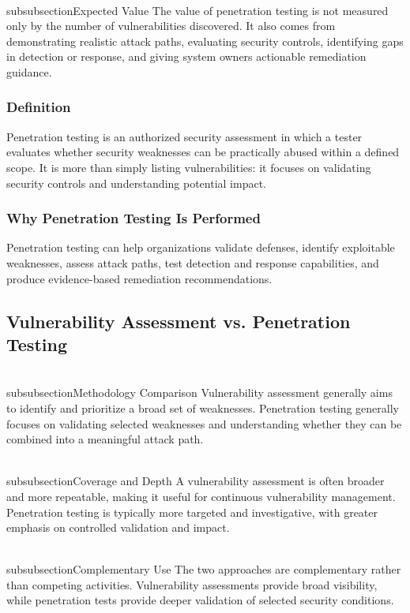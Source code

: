 \documentclass[11pt,a4paper]{article}
\begin{document}
\\subsubsection{Expected Value}
The value of penetration testing is not measured only by the number of vulnerabilities discovered. It also comes from demonstrating realistic attack paths, evaluating security controls, identifying gaps in detection or response, and giving system owners actionable remediation guidance.

\subsubsection{Definition}
Penetration testing is an authorized security assessment in which a tester evaluates whether security weaknesses can be practically abused within a defined scope. It is more than simply listing vulnerabilities: it focuses on validating security controls and understanding potential impact.

\subsubsection{Why Penetration Testing Is Performed}
Penetration testing can help organizations validate defenses, identify exploitable weaknesses, assess attack paths, test detection and response capabilities, and produce evidence-based remediation recommendations.

\subsection{Vulnerability Assessment vs. Penetration Testing}
\\subsubsection{Methodology Comparison}
Vulnerability assessment generally aims to identify and prioritize a broad set of weaknesses. Penetration testing generally focuses on validating selected weaknesses and understanding whether they can be combined into a meaningful attack path.

\\subsubsection{Coverage and Depth}
A vulnerability assessment is often broader and more repeatable, making it useful for continuous vulnerability management. Penetration testing is typically more targeted and investigative, with greater emphasis on controlled validation and impact.

\\subsubsection{Complementary Use}
The two approaches are complementary rather than competing activities. Vulnerability assessments provide broad visibility, while penetration tests provide deeper validation of selected security conditions.
\end{document}

